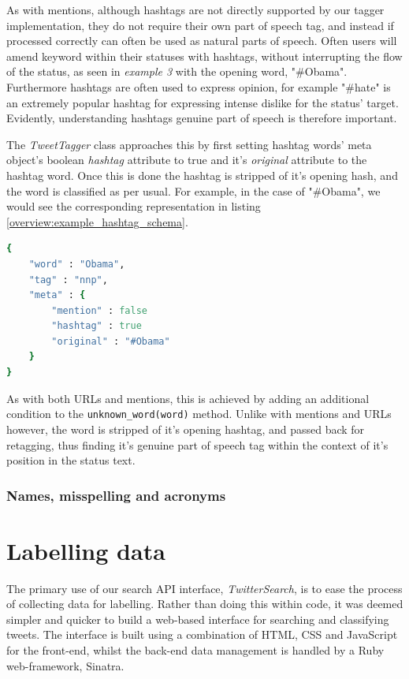 As with mentions, although hashtags are not directly supported by our tagger implementation, they do not require their own part of speech tag, and instead if processed correctly can often be used as natural parts of speech. Often users will amend keyword within their statuses with hashtags, without interrupting the flow of the status, as seen in \emph{example 3} with the opening word, "\#Obama". Furthermore hashtags are often used to express opinion, for example "\#hate" is an extremely popular hashtag for expressing intense dislike for the status' target. Evidently, understanding hashtags genuine part of speech is therefore important.

The \emph{TweetTagger} class approaches this by first setting hashtag words' meta object's boolean \emph{hashtag} attribute to true and it's \emph{original} attribute to the hashtag word. Once this is done the hashtag is stripped of it's opening hash, and the word is classified as per usual. For example, in the case of "\#Obama", we would see the corresponding representation in listing \ref{overview:example_hashtag_schema}.

\begin{lstlisting}[language=Ruby, numbers=none, caption={Example JSON structure for representing a hashtag word}, label=overview:example_hashtag_schema]
{
	"word" : "Obama", 
	"tag" : "nnp",
	"meta" : {
		"mention" : false
		"hashtag" : true
		"original" : "#Obama"
	}
}
\end{lstlisting}

As with both URLs and mentions, this is achieved by adding an additional condition to the \texttt{unknown\_word(word)} method. Unlike with mentions and URLs however, the word is stripped of it's opening hashtag, and passed back for retagging, thus finding it's genuine part of speech tag within the context of it's position in the status text.

\subsubsection{Names, misspelling and acronyms}

\section{Labelling data}
\label{retrieval:labelling}

The primary use of our search API interface, \emph{TwitterSearch}, is to ease the process of collecting data for labelling. Rather than doing this within code, it was deemed simpler and quicker to build a web-based interface for searching and classifying tweets. The interface is built using a combination of HTML, CSS and JavaScript for the front-end, whilst the back-end data management is handled by a Ruby web-framework, Sinatra.

